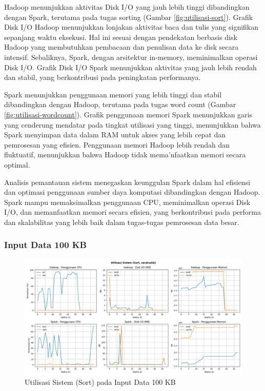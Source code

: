 Hadoop menunjukkan aktivitas Disk I/O yang jauh lebih tinggi dibandingkan dengan Spark, terutama pada tugas sorting (Gambar \ref{fig:utilisasi-sort}). Grafik Disk I/O Hadoop menunjukkan lonjakan aktivitas baca dan tulis yang signifikan sepanjang waktu eksekusi. Hal ini sesuai dengan pendekatan berbasis disk Hadoop yang membutuhkan pembacaan dan penulisan data ke disk secara intensif. Sebaliknya, Spark, dengan arsitektur in-memory, meminimalkan operasi Disk I/O. Grafik Disk I/O Spark menunjukkan aktivitas yang jauh lebih rendah dan stabil, yang berkontribusi pada peningkatan performanya.

Spark menunjukkan penggunaan memori yang lebih tinggi dan stabil dibandingkan dengan Hadoop, terutama pada tugas word count (Gambar \ref{fig:utilisasi-wordcount}). Grafik penggunaan memori Spark menunjukkan garis yang cenderung mendatar pada tingkat utilisasi yang tinggi, menunjukkan bahwa Spark menyimpan data dalam RAM untuk akses yang lebih cepat dan pemrosesan yang efisien. Penggunaan memori Hadoop lebih rendah dan fluktuatif, menunjukkan bahwa Hadoop tidak mema'nfaatkan memori secara optimal. 

Analisis pemantauan sistem menegaskan keunggulan Spark dalam hal efisiensi dan optimasi penggunaan sumber daya komputasi dibandingkan dengan Hadoop. Spark mampu memaksimalkan penggunaan CPU, meminimalkan operasi Disk I/O, dan memanfaatkan memori secara efisien, yang berkontribusi pada performa dan skalabilitas yang lebih baik dalam tugas-tugas pemrosesan data besar.

\subsubsection{Input Data 100 KB}
\begin{figure}[h]
    \centering
    \includegraphics[width=1\textwidth]{figures/ch04/5-util-sistem-sort-seratuskb}
    \caption{Utilisasi Sistem (Sort) pada Input Data 100 KB}
    \label{fig:5-util-sistem-sort-seratuskb}
\end{figure}

